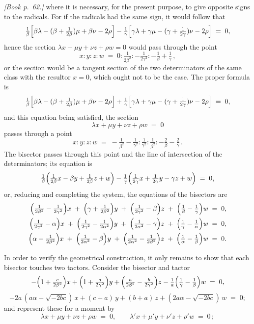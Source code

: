 \documentclass[11pt]{article}
\begin{document}
\noindent\emph{[Book p.~62.]} where it is necessary, for the present purpose, to give opposite signs to the radicals. For if the radicals had the same sign, it would follow that
\[
\tfrac{1}{\beta}\Bigl[\beta\lambda - (\beta + \tfrac{1}{2\beta})\mu + \beta\nu - 2\rho\Bigr] - \tfrac{1}{\gamma}\Bigl[\gamma\lambda + \gamma\mu - (\gamma + \tfrac{1}{2\gamma})\nu - 2\rho\Bigr] \;=\; 0,
\]
hence the section $\lambda x + \mu y + \nu z + \rho w = 0$ would pass through the point
\[
x : y : z : w \;=\; 0 : \tfrac{1}{2\beta^{2}} : -\tfrac{1}{2\gamma^{2}} : -\tfrac{1}{\beta} + \tfrac{1}{\gamma}\,,
\]
or the section would be a tangent section of the two determinators of the same class with the resultor $x = 0$, which ought not to be the case. The proper formula is
\[
\tfrac{1}{\beta}\Bigl[\beta\lambda - (\beta + \tfrac{1}{2\beta})\mu + \beta\nu - 2\rho\Bigr] + \tfrac{1}{\gamma}\Bigl[\gamma\lambda + \gamma\mu - (\gamma + \tfrac{1}{2\gamma})\nu - 2\rho\Bigr] \;=\; 0,
\]
and this equation being satisfied, the section
\[
\lambda x + \mu y + \nu z + \rho w \;=\; 0
\]
passes through a point
\[
x : y : z : w \;=\; -\tfrac{1}{\beta^{2}} - \tfrac{1}{\gamma^{2}} : \tfrac{1}{\gamma^{2}} : \tfrac{1}{\beta^{2}} : -\tfrac{2}{\beta} - \tfrac{2}{\gamma}\,.
\]
The bisector passes through this point and the line of intersection of the determinators; its equation is
\[
\tfrac{1}{\beta}\Bigl(\tfrac{1}{2\beta}x - \beta y + \tfrac{1}{2\beta}z + w\Bigr) - \tfrac{1}{\gamma}\Bigl(\tfrac{1}{2\gamma}x + \tfrac{1}{2\gamma}y - \gamma z + w\Bigr) \;=\; 0,
\]
or, reducing and completing the system, the equations of the bisectors are
\begin{align*}
\Bigl(\tfrac{1}{2\beta^{2}} - \tfrac{1}{2\gamma^{2}}\Bigr)x \;+\; \Bigl(\gamma + \tfrac{1}{2\beta^{2}}\Bigr)y \;+\; \Bigl(\tfrac{1}{2\gamma^{2}} - \beta\Bigr)z \;+\; \Bigl(\tfrac{1}{\beta} - \tfrac{1}{\gamma}\Bigr)w &\;=\; 0,\\
\Bigl(\tfrac{1}{2\gamma^{2}} - \alpha\Bigr)x \;+\; \Bigl(\tfrac{1}{2\gamma^{2}} - \tfrac{1}{2\alpha^{2}}\Bigr)y \;+\; \Bigl(\tfrac{1}{2\alpha^{2}} - \gamma\Bigr)z \;+\; \Bigl(\tfrac{1}{\gamma} - \tfrac{1}{\alpha}\Bigr)w &\;=\; 0,\\
\Bigl(\alpha - \tfrac{1}{2\beta^{2}}\Bigr)x \;+\; \Bigl(\tfrac{1}{2\alpha^{2}} - \beta\Bigr)y \;+\; \Bigl(\tfrac{1}{2\alpha^{2}} - \tfrac{1}{2\beta^{2}}\Bigr)z \;+\; \Bigl(\tfrac{1}{\alpha} - \tfrac{1}{\beta}\Bigr)w &\;=\; 0.
\end{align*}

In order to verify the geometrical construction, it only remains to show that each bisector touches two tactors. Consider the bisector and tactor
\[
-\Bigl(1 + \tfrac{c}{2\beta^{2}}\Bigr)x + \Bigl(1 + \tfrac{a}{2\gamma^{2}}\Bigr)y + \Bigl(\tfrac{a}{2\beta^{2}} - \tfrac{b}{2\gamma^{2}}\Bigr)z - \tfrac{1}{a}\Bigl(\tfrac{1}{\gamma} - \tfrac{1}{\beta}\Bigr)w \;=\; 0,
\]
\[
-2a\,(a\alpha - \sqrt{-2bc})\,x + (c + a)\,y + (b + a)\,z + (2a\alpha - \sqrt{-2bc})\,w \;=\; 0;
\]
and represent these for a moment by
\[
\lambda x + \mu y + \nu z + \rho w \;=\; 0,\qquad \lambda' x + \mu' y + \nu' z + \rho' w \;=\; 0\,;
\]
\end{document}
